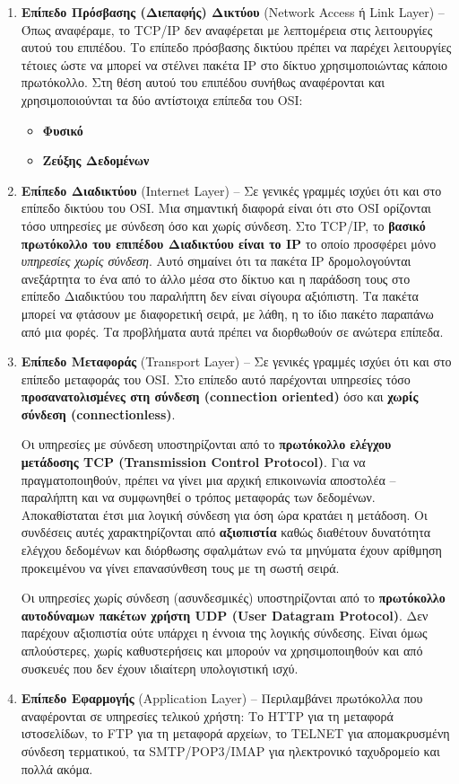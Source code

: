 \begin{enumerate}
\item \textbf{Επίπεδο Πρόσβασης (Διεπαφής) Δικτύου} (Network Access ή Link Layer) -- Όπως αναφέραμε, το TCP/IP δεν αναφέρεται με λεπτομέρεια στις λειτουργίες αυτού του επιπέδου. Το επίπεδο πρόσβασης δικτύου πρέπει να παρέχει λειτουργίες τέτοιες ώστε να μπορεί να στέλνει πακέτα IP στο δίκτυο χρησιμοποιώντας κάποιο πρωτόκολλο. Στη θέση αυτού του επιπέδου συνήθως αναφέρονται και χρησιμοποιούνται τα δύο αντίστοιχα επίπεδα του OSI:
  \begin{itemize}
     \item \textbf{Φυσικό}
     \item \textbf{Ζεύξης Δεδομένων}
  \end{itemize}
\item \textbf{Επίπεδο Διαδικτύου} (Internet Layer) -- Σε γενικές γραμμές ισχύει ότι και στο επίπεδο δικτύου του OSI. Μια σημαντική διαφορά είναι ότι στο OSI ορίζονται τόσο υπηρεσίες με σύνδεση όσο και χωρίς σύνδεση. Στο TCP/IP, το \textbf{βασικό πρωτόκολλο του επιπέδου Διαδικτύου είναι το IP} το οποίο προσφέρει μόνο \emph{υπηρεσίες χωρίς σύνδεση}. Αυτό σημαίνει ότι τα πακέτα IP δρομολογούνται ανεξάρτητα το ένα από το άλλο μέσα στο δίκτυο και η παράδοση τους στο επίπεδο Διαδικτύου του παραλήπτη δεν είναι σίγουρα αξιόπιστη. Τα πακέτα μπορεί να φτάσουν με διαφορετική σειρά, με λάθη, η το ίδιο πακέτο παραπάνω από μια φορές. Τα προβλήματα αυτά πρέπει να διορθωθούν σε ανώτερα επίπεδα.
\item \textbf{Επίπεδο Μεταφοράς} (Transport Layer) -- Σε γενικές γραμμές ισχύει ότι και στο επίπεδο μεταφοράς του OSI. Στο επίπεδο αυτό παρέχονται υπηρεσίες τόσο \textbf{προσανατολισμένες στη σύνδεση (connection oriented)} όσο και \textbf{χωρίς σύνδεση (connectionless)}.

Οι υπηρεσίες με σύνδεση υποστηρίζονται από το \textbf{πρωτόκολλο ελέγχου μετάδοσης TCP (Transmission Control Protocol)}. Για να πραγματοποιηθούν, πρέπει να γίνει μια αρχική επικοινωνία αποστολέα -- παραλήπτη και να συμφωνηθεί ο τρόπος μεταφοράς των δεδομένων. Αποκαθίσταται έτσι μια λογική σύνδεση για όση ώρα κρατάει η μετάδοση. Οι συνδέσεις αυτές χαρακτηρίζονται από \textbf{αξιοπιστία} καθώς διαθέτουν δυνατότητα ελέγχου δεδομένων και διόρθωσης σφαλμάτων ενώ τα μηνύματα έχουν αρίθμηση προκειμένου να γίνει επανασύνθεση τους με τη σωστή σειρά. 

Οι υπηρεσίες χωρίς σύνδεση (ασυνδεσμικές) υποστηρίζονται από το \textbf{πρωτόκολλο αυτοδύναμων πακέτων χρήστη UDP (User Datagram Protocol)}. Δεν παρέχουν αξιοπιστία ούτε υπάρχει η έννοια της λογικής σύνδεσης. Είναι όμως απλούστερες, χωρίς καθυστερήσεις και μπορούν να χρησιμοποιηθούν και από συσκευές που δεν έχουν ιδιαίτερη υπολογιστική ισχύ.
\item \textbf{Επίπεδο Εφαρμογής} (Application Layer) -- Περιλαμβάνει πρωτόκολλα που αναφέρονται σε υπηρεσίες τελικού χρήστη: Το HTTP για τη μεταφορά ιστοσελίδων, το FTP για τη μεταφορά αρχείων, το TELNET για απομακρυσμένη σύνδεση τερματικού, τα SMTP/POP3/IMAP για ηλεκτρονικό ταχυδρομείο και πολλά ακόμα. 
\end{enumerate}